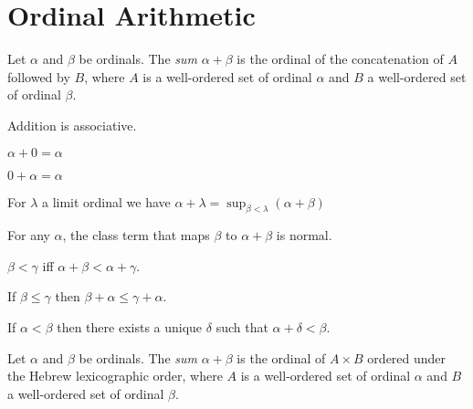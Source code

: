 \section{Ordinal Arithmetic}

\begin{definition}[Sum]
    Let $\alpha$ and $\beta$ be ordinals. The \emph{sum}
$\alpha + \beta$ is the ordinal of the concatenation of $A$
followed by $B$, where $A$ is a well-ordered set of ordinal $\alpha$
and $B$ a well-ordered set of ordinal $\beta$.
\end{definition}

\begin{theorem}
    Addition is associative.
\end{theorem}

\begin{theorem}
    $\alpha + 0 = \alpha$
\end{theorem}

\begin{theorem}
    $0 + \alpha = \alpha$
\end{theorem}

\begin{theorem}
    For $\lambda$ a limit ordinal we have $\alpha + \lambda = \sup_{\beta < \lambda} (\alpha + \beta)$
\end{theorem}

\begin{theorem}
    For any $\alpha$, the class term that maps $\beta$ to $\alpha + \beta$ is normal.
\end{theorem}

\begin{theorem}
    $\beta < \gamma$ iff $\alpha + \beta < \alpha + \gamma$.
\end{theorem}

\begin{theorem}
    If $\beta \leq \gamma$ then $\beta + \alpha \leq \gamma + \alpha$.
\end{theorem}

\begin{theorem}
    If $\alpha < \beta$ then there exists a unique $\delta$ such that $\alpha + \delta < \beta$.
\end{theorem}

\begin{definition}[Product]
    Let $\alpha$ and $\beta$ be ordinals. The \emph{sum}
$\alpha + \beta$ is the ordinal of $A \times B$ ordered under
the Hebrew
lexicographic order, where $A$ is a well-ordered set of ordinal $\alpha$
and $B$ a well-ordered set of ordinal $\beta$.
\end{definition}

